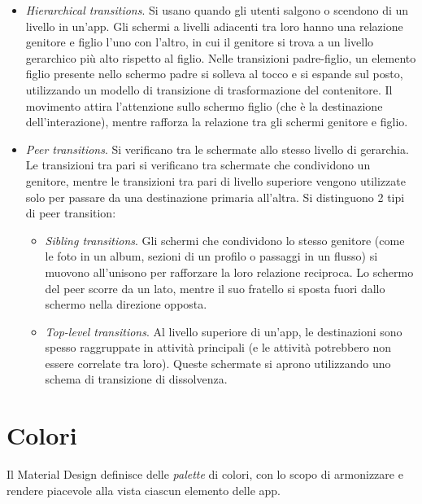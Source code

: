 \documentclass[12pt, a4paper]{report}
\begin{document}
    		\begin{itemize}
    			\item \textit{Hierarchical transitions}. Si usano quando gli utenti salgono o scendono di un livello in un'app. Gli schermi a livelli adiacenti tra loro hanno una relazione genitore e
    			figlio l'uno con l'altro, in cui il genitore si trova a un livello gerarchico più alto rispetto al figlio. Nelle transizioni padre-figlio, un elemento figlio presente nello schermo padre
    			si solleva al tocco e si espande sul posto, utilizzando un modello di transizione di trasformazione del contenitore. Il movimento attira l'attenzione sullo schermo figlio (che è la destinazione
    			dell'interazione), mentre rafforza la relazione tra gli schermi genitore e figlio.
    			\item \textit{Peer transitions}. Si verificano tra le schermate allo stesso livello di gerarchia. Le transizioni tra pari si verificano tra schermate che condividono un genitore, mentre le transizioni tra pari
    			di livello superiore vengono utilizzate solo per passare da una destinazione primaria all'altra. Si distinguono 2 tipi di peer transition:
    			\begin{itemize}
    				\item \textit{Sibling transitions}. Gli schermi che condividono lo stesso genitore (come le foto in un album, sezioni di un profilo o passaggi in un flusso) si muovono all'unisono per
    				rafforzare la loro relazione reciproca. Lo schermo del peer scorre da un lato, mentre il suo fratello si sposta fuori dallo schermo nella direzione opposta.
    				\item \textit{Top-level transitions}. Al livello superiore di un'app, le destinazioni sono spesso raggruppate in attività principali (e le attività potrebbero non essere correlate tra loro).
    				Queste schermate si aprono utilizzando uno schema di transizione di dissolvenza.
    			\end{itemize}
    		\end{itemize}
	
	
	\section{Colori}
	Il Material Design definisce delle \textit{palette} di colori, con lo scopo di armonizzare e rendere piacevole alla vista ciascun elemento delle app.
	
\end{document}
